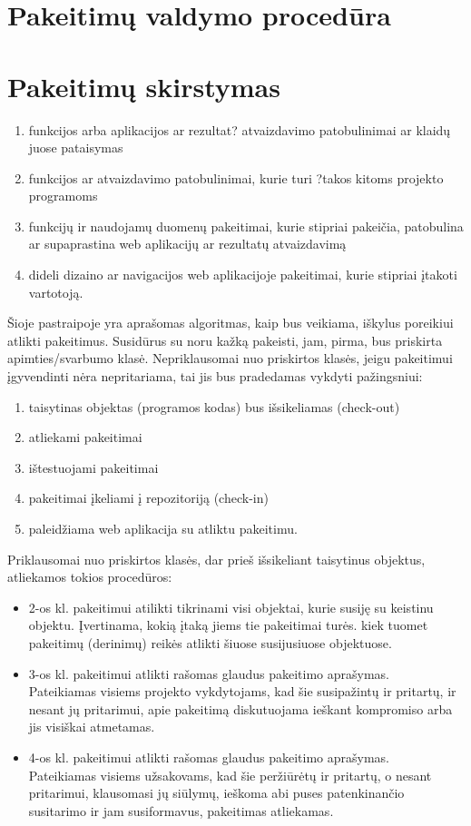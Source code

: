 \documentclass[a4paper,12pt]{article}
\begin{document}
\section{Pakeitimų valdymo procedūra}

\section{Pakeitim\k u skirstymas}
\begin{enumerate}
	\item funkcijos arba aplikacijos ar rezultat? atvaizdavimo patobulinimai ar klaid\k u juose pataisymas
	\item funkcijos ar atvaizdavimo patobulinimai, kurie turi ?takos kitoms projekto programoms
	\item funkcij\k u ir naudojam\k u duomen\k u pakeitimai, kurie stipriai pakei\v cia, patobulina ar supaprastina web aplikacij\k u ar rezultat\k u atvaizdavim\k a
	\item dideli dizaino ar navigacijos web aplikacijoje pakeitimai, kurie stipriai \k itakoti vartotoj\k a.
\end{enumerate}

Šioje pastraipoje yra aprašomas algoritmas, kaip bus veikiama, iškylus poreikiui atlikti pakeitimus. 
Susidūrus su noru kažką pakeisti, jam, pirma, bus priskirta apimties/svarbumo klasė. Nepriklausomai nuo priskirtos klasės, jeigu pakeitimui įgyvendinti nėra nepritariama, tai jis bus pradedamas vykdyti pažingsniui: \\
\begin{enumerate}
	\item taisytinas objektas (programos kodas) bus išsikeliamas
 (check-out)
 	\item atliekami pakeitimai
 	\item ištestuojami pakeitimai
 	\item pakeitimai įkeliami į repozitoriją (check-in)
 	\item paleidžiama web aplikacija su atliktu pakeitimu.
\end{enumerate}
Priklausomai nuo priskirtos klasės, dar prieš išsikeliant taisytinus objektus, atliekamos tokios procedūros: 
\begin{itemize}
	\item 2-os kl. pakeitimui atilikti tikrinami visi objektai, kurie susiję su keistinu objektu.
		Įvertinama, kokią įtaką jiems tie pakeitimai turės. kiek tuomet pakeitimų (derinimų) reikės atlikti šiuose susijusiuose objektuose.		
	\item 3-os kl. pakeitimui atlikti rašomas glaudus pakeitimo aprašymas.\\
	Pateikiamas visiems projekto vykdytojams, kad šie susipažintų ir pritartų, ir nesant jų pritarimui, apie pakeitimą diskutuojama ieškant kompromiso arba jis visiškai atmetamas.
	\item 4-os kl. pakeitimui atlikti rašomas glaudus pakeitimo aprašymas.\\
	Pateikiamas visiems užsakovams, kad šie peržiūrėtų ir pritartų, o nesant pritarimui, klausomasi jų siūlymų, ieškoma abi puses patenkinančio susitarimo ir jam susiformavus, pakeitimas atliekamas. 
\end{itemize}
 
\end{document}
